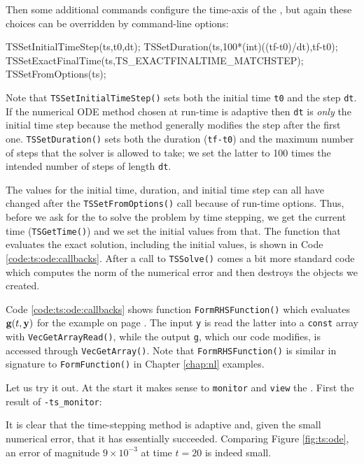 Then some additional commands configure the time-axis of the \pTS, but again these choices can be overridden by command-line options:
\begin{code}
  TSSetInitialTimeStep(ts,t0,dt);
  TSSetDuration(ts,100*(int)((tf-t0)/dt),tf-t0);
  TSSetExactFinalTime(ts,TS_EXACTFINALTIME_MATCHSTEP);
  TSSetFromOptions(ts);
\end{code}
Note that \texttt{TSSetInitialTimeStep()} sets both the initial time \texttt{t0} and the step \texttt{dt}.  If the numerical ODE method chosen at run-time is adaptive then \texttt{dt} is \emph{only} the initial time step because the method generally modifies the step after the first one.  \texttt{TSSetDuration()} sets both the duration (\texttt{tf-t0}) and the maximum number of steps that the solver is allowed to take; we set the latter to 100 times the intended number of steps of length \texttt{dt}.

The values for the initial time, duration, and initial time step can all have changed after the \texttt{TSSetFromOptions()} call because of run-time options.  Thus, before we ask for the \pTS to solve the problem by time stepping, we get the current time (\texttt{TSGetTime()}) and we set the initial values from that.  The function that evaluates the exact solution, including the initial values, is shown in Code \ref{code:ts:ode:callbacks}.  After a call to \texttt{TSSolve()} comes a bit more standard code which computes the norm of the numerical error and then destroys the objects we created.

Code \ref{code:ts:ode:callbacks} shows function \texttt{FormRHSFunction()} which evaluates $\mathbf{g}(t,\mathbf{y})$ for the example on page \pageref{ex:ts:odeeasy}.  The input \pVec \texttt{y} is read the latter into a \texttt{const} array with \texttt{VecGetArrayRead()}, while the output \pVec \texttt{g}, which our code modifies, is accessed through \texttt{VecGetArray()}.  Note that \texttt{FormRHSFunction()} is similar in signature to \texttt{FormFunction()} in Chapter \ref{chap:nl} examples.


Let us try it out.  At the start it makes sense to \texttt{monitor} and \texttt{view} the \pTS.  First the result of \texttt{-ts\_monitor}:
It is clear that the time-stepping method is adaptive and, given the small numerical error, that it has essentially succeeded.  Comparing Figure \ref{fig:ts:ode}, an error of magnitude $9^{-3}$ at time $t=20$ is indeed small.

